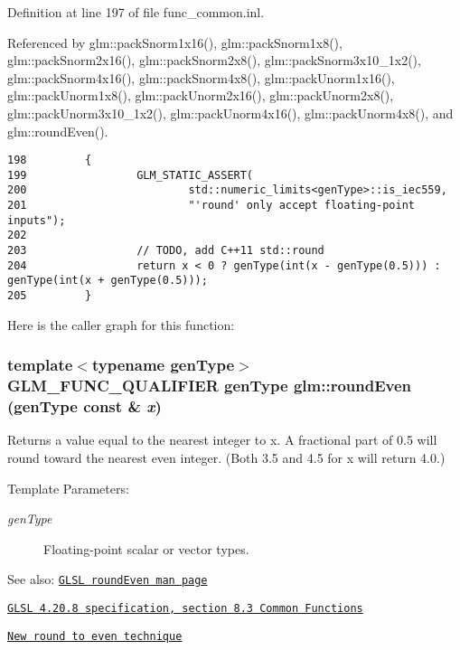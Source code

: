Definition at line 197 of file func\_\-common.inl.

Referenced by glm::packSnorm1x16(), glm::packSnorm1x8(), glm::packSnorm2x16(), glm::packSnorm2x8(), glm::packSnorm3x10\_\-1x2(), glm::packSnorm4x16(), glm::packSnorm4x8(), glm::packUnorm1x16(), glm::packUnorm1x8(), glm::packUnorm2x16(), glm::packUnorm2x8(), glm::packUnorm3x10\_\-1x2(), glm::packUnorm4x16(), glm::packUnorm4x8(), and glm::roundEven().

\begin{Code}\begin{verbatim}198         {
199                 GLM_STATIC_ASSERT(
200                         std::numeric_limits<genType>::is_iec559,
201                         "'round' only accept floating-point inputs");
202 
203                 // TODO, add C++11 std::round
204                 return x < 0 ? genType(int(x - genType(0.5))) : genType(int(x + genType(0.5)));
205         }
\end{verbatim}
\end{Code}




Here is the caller graph for this function:\hypertarget{group__core__func__common_ge07e5945cc0443ab91a28da0aa2ba864}{
\subsubsection[roundEven]{\setlength{\rightskip}{0pt plus 5cm}template$<$typename genType$>$ GLM\_\-FUNC\_\-QUALIFIER genType glm::roundEven (genType const \& {\em x})}}
\label{group__core__func__common_ge07e5945cc0443ab91a28da0aa2ba864}


Returns a value equal to the nearest integer to x. A fractional part of 0.5 will round toward the nearest even integer. (Both 3.5 and 4.5 for x will return 4.0.)

\begin{Desc}
\item[Template Parameters:]
\begin{description}
\item[{\em genType}]Floating-point scalar or vector types.\end{description}
\end{Desc}
\begin{Desc}
\item[See also:]\href{http://www.opengl.org/sdk/docs/manglsl/xhtml/roundEven.xml}{\tt GLSL roundEven man page} 

\href{http://www.opengl.org/registry/doc/GLSLangSpec.4.20.8.pdf}{\tt GLSL 4.20.8 specification, section 8.3 Common Functions} 

\href{http://developer.amd.com/documentation/articles/pages/New-Round-to-Even-Technique.aspx}{\tt New round to even technique} \end{Desc}



